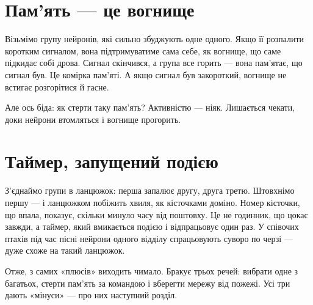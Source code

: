 \section*{Пам'ять --- це вогнище}

Візьмімо групу нейронів, які сильно збуджують одне одного. Якщо її розпалити коротким сигналом, вона підтримуватиме сама себе, як вогнище, що саме підкидає собі дрова. Сигнал скінчився, а група все горить --- вона пам'ятає, що сигнал був. Це комірка пам'яті. А якщо сигнал був закороткий, вогнище не встигає розгорітися й гасне.

Але ось біда: як стерти таку пам'ять? Активністю --- ніяк. Лишається чекати, доки нейрони втомляться і вогнище прогорить.

\section*{Таймер, запущений подією}

З'єднаймо групи в ланцюжок: перша запалює другу, друга третю. Штовхнімо першу --- і ланцюжком побіжить хвиля, як кісточками доміно. Номер кісточки, що впала, показує, скільки минуло часу від поштовху. Це не годинник, що цокає завжди, а таймер, який вмикається подією і відпрацьовує один раз. У співочих птахів під час пісні нейрони одного відділу спрацьовують суворо по черзі --- дуже схоже на такий ланцюжок.

Отже, з самих «плюсів» виходить чимало. Бракує трьох речей: вибрати одне з багатьох, стерти пам'ять за командою і вберегти мережу від пожежі. Усі три дають «мінуси» --- про них наступний розділ.

